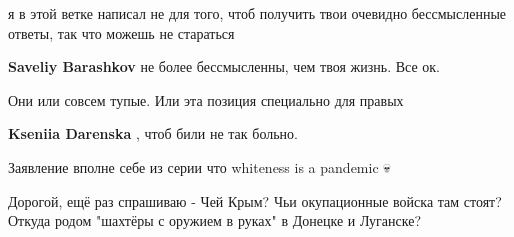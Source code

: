 \begin{itemize}
\begin{itemize}
я в этой ветке написал не для того, чтоб получить твои очевидно бессмысленные ответы, так что можешь не стараться

 
\textbf{Saveliy Barashkov} не более бессмысленны, чем твоя жизнь. Все ок.

\end{itemize}

 
Они или совсем тупые. Или эта позиция специально для правых

\begin{itemize}
 
\textbf{Kseniia Darenska} , чтоб били не так больно.
\end{itemize}

 
Заявление вполне себе из серии что whiteness is a pandemic 💀


 

Дорогой, ещё раз спрашиваю - Чей Крым? Чьи окупационные войска там стоят?
Откуда родом "шахтёры с оружием в руках" в Донецке и Луганске?
\end{itemize}

